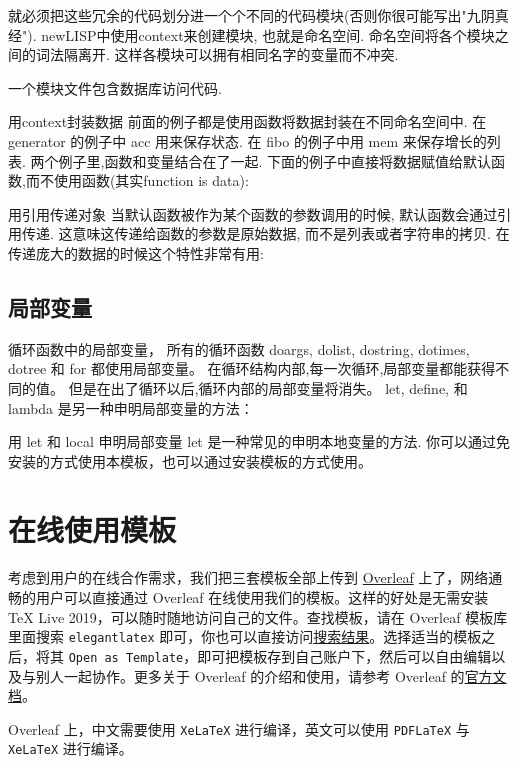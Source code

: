 \documentclass[cn,11pt]{elegantbook}
\begin{document}
 就必须把这些冗余的代码划分进一个个不同的代码模块(否则你很可能写出"九阴真经").
   newLISP中使用context来创建模块, 也就是命名空间. 命名空间将各个模块之间的词法隔离开.
   这样各模块可以拥有相同名字的变量而不冲突.

一个模块文件包含数据库访问代码.

用context封装数据
前面的例子都是使用函数将数据封装在不同命名空间中. 在 generator 的例子中 acc 用来保存状态. 在 fibo 的例子中用 mem 来保存增长的列表. 两个例子里,函数和变量结合在了一起. 下面的例子中直接将数据赋值给默认函数,而不使用函数(其实function is data):

用引用传递对象
当默认函数被作为某个函数的参数调用的时候, 默认函数会通过引用传递. 这意味这传递给函数的参数是原始数据, 而不是列表或者字符串的拷贝. 在传递庞大的数据的时候这个特性非常有用:

\subsection{局部变量}

循环函数中的局部变量，
所有的循环函数 doargs, dolist, dostring, dotimes, dotree 和 for 都使用局部变量。 在循环结构内部,每一次循环,局部变量都能获得不同的值。
但是在出了循环以后,循环内部的局部变量将消失。
let, define, 和 lambda 是另一种申明局部变量的方法：

用 let 和 local 申明局部变量
let 是一种常见的申明本地变量的方法.
你可以通过免安装的方式使用本模板，也可以通过安装模板的方式使用。


\section{在线使用模板}
考虑到用户的在线合作需求，我们把三套模板全部上传到 \href{https://www.overleaf.com/}{Overleaf} 上了，网络通畅的用户可以直接通过 Overleaf 在线使用我们的模板。这样的好处是无需安装 \TeX{} Live 2019，可以随时随地访问自己的文件。查找模板，请在 Overleaf 模板库里面搜索 \lstinline{elegantlatex} 即可，你也可以直接访问\href{https://www.overleaf.com/latex/templates?addsearch=elegantlatex}{搜索结果}。选择适当的模板之后，将其 \lstinline{Open as Template}，即可把模板存到自己账户下，然后可以自由编辑以及与别人一起协作。更多关于 Overleaf 的介绍和使用，请参考 Overleaf 的\href{https://www.overleaf.com/learn}{官方文档}。

\begin{remark}
Overleaf 上，中文需要使用 \lstinline{XeLaTeX} 进行编译，英文可以使用 \lstinline{PDFLaTeX} 与 \lstinline{XeLaTeX} 进行编译。
\end{remark}
\end{document}
